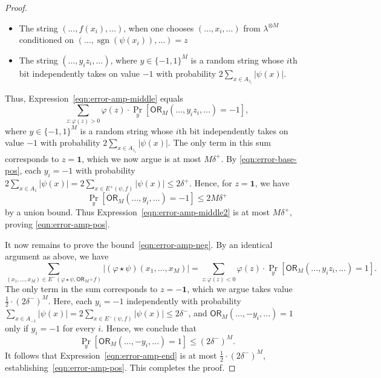 \documentclass[11pt, letterpaper, fleqn]{article}
\theoremstyle{plain}
\newcommand{\sgn}{\mathrm{sign}}
\newcommand{\OR}{\mathsf{ OR}}
\newcommand{\ls}{\star}
\renewcommand{\sgn}{\operatorname{sgn}}
\begin{document}
\begin{proof}
\begin{itemize}
\item The string $(\dots, f(x_i), \dots)$, when one chooses $(\dots, x_i, \dots)$ from $\lambda^{\otimes M}$ conditioned on \newline $(\dots, \sgn(\psi(x_i)), \dots) = z$
\item The string $(\dots, y_iz_i, \dots)$, where $y \in \{-1, 1\}^{M}$ is a random string whose $i$th bit independently
takes on value $-1$ with probability $2 \sum_{x \in A_{z_i}} |\psi(x)|$.
\end{itemize}
Thus, Expression~\eqref{eqn:error-amp-middle} equals
\begin{equation}\sum_{z : \varphi(z) > 0} \varphi(z) \cdot \Pr_y[\OR_M(\dots, y_iz_i, \dots) = -1], \label{eqn:error-amp-middle2}\end{equation}
where $y \in \{-1, 1\}^{M}$ is a random string whose $i$th bit independently
takes on value $-1$ with probability $2 \sum_{x \in A_{z_i}} |\psi(x)|$. The only term in this sum corresponds to $z=\mathbf{1}$, which we now argue is at most $M \delta^+$.
By \eqref{eqn:error-base-pos}, each $y_i = -1$ with probability $2 \sum_{x \in A_{1}} |\psi(x)| = 2\sum_{x \in E^+(\psi, f)} |\psi(x)| \le 2\delta^+$.  Hence, for $z = \mathbf{1}$, we have 
\[\Pr_y[\OR_M(\dots, y_i, \dots) = -1] \le 2 M \delta^+\]
by a union bound. Thus Expression~\eqref{eqn:error-amp-middle2} is at most $M \delta^+$, proving \eqref{eqn:error-amp-pos}.

It now remains to prove the bound~\eqref{eqn:error-amp-neg}. By an identical argument as above, we have
\begin{equation}\sum_{(x_1, \dots, x_{M}) \in E^-(\varphi \ls \psi, \OR_M \circ f)} |(\varphi \ls \psi)(x_1, \dots, x_M)| = \sum_{z : \varphi(z) < 0} \varphi(z) \cdot \Pr_y[\OR_M(\dots, y_iz_i, \dots) = 1]. \label{eqn:error-amp-end}\end{equation}
The only term in the sum corresponds to $z=-\mathbf{1}$, which we argue takes value $\frac{1}{2} \cdot (2\delta^-)^{M}$. 
Here, each $y_i=-1$ independently with probability $\sum_{x \in A_{-1}} |\psi(x)| = 2\sum_{x \in E^-(\psi, f)} |\psi(x)| \le 2\delta^-$, and $\OR_M(\dots, -y_i, \dots)=1$ only if $y_i = -1$ for every $i$. Hence, we conclude that
\[\Pr_y[\OR_{M}\left(\dots, -y_i, \dots\right) = 1]  \le (2\delta^-)^M. \]
It follows that Expression~\eqref{eqn:error-amp-end} is at most $\frac{1}{2} \cdot (2\delta^-)^M$, establishing~\eqref{eqn:error-amp-pos}. This completes the proof.
\end{proof}
\end{document}
